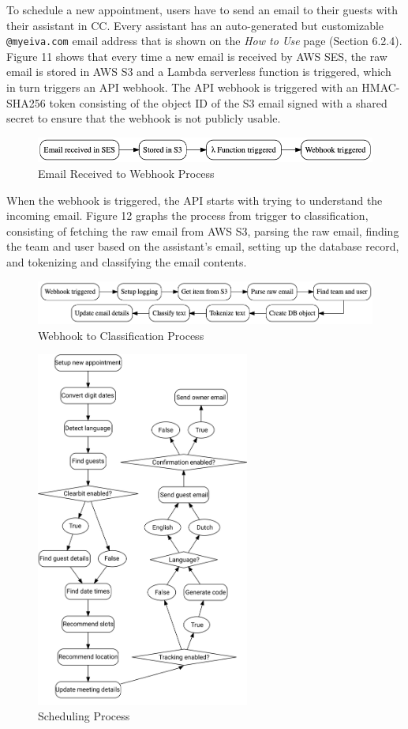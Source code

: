 \documentclass{article}
\begin{document}
To schedule a new appointment, users have to send an email to their guests with their assistant in CC. Every assistant has an auto-generated but customizable \texttt{@myeiva.com} email address that is shown on the \emph{How to Use} page (Section 6.2.4). Figure 11 shows that every time a new email is received by AWS SES, the raw email is stored in AWS S3 and a Lambda serverless function is triggered, which in turn triggers an API webhook. The API webhook is triggered with an HMAC-SHA256 token consisting of the object ID of the S3 email signed with a shared secret to ensure that the webhook is not publicly usable.

\begin{figure}[h]
	\includegraphics[width=\textwidth]{ses-process.png}
	\caption{Email Received to Webhook Process}
\end{figure}

When the webhook is triggered, the API starts with trying to understand the incoming email. Figure 12 graphs the process from trigger to classification, consisting of fetching the raw email from AWS S3, parsing the raw email, finding the team and user based on the assistant's email, setting up the database record, and tokenizing and classifying the email contents.

\begin{figure}[h]
	\includegraphics[width=\textwidth]{webhook-process.png}
	\caption{Webhook to Classification Process}
\end{figure}

\begin{figure}[h]
	\center
	\includegraphics[width=7cm]{schedule-process.png}
	\caption{Scheduling Process}
\end{figure}
\end{document}
